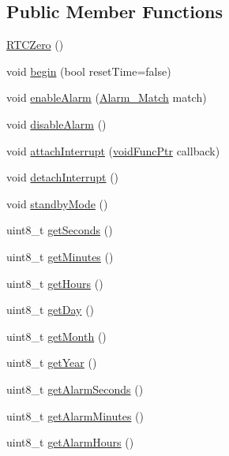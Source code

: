 \subsection*{Public Member Functions}
\begin{DoxyCompactItemize}
\item 
\hyperlink{class_r_t_c_zero_af74f4cc9bc122628c0023e77b7b18c76}{R\+T\+C\+Zero} ()
\item 
void \hyperlink{class_r_t_c_zero_ac6ad9d73cb8d3a0575e7cfc2b26a5412}{begin} (bool reset\+Time=false)
\item 
void \hyperlink{class_r_t_c_zero_af2923fee4310485bc922898376f5042c}{enable\+Alarm} (\hyperlink{class_r_t_c_zero_a331ac87204394f0e197122b8962149cc}{Alarm\+\_\+\+Match} match)
\item 
void \hyperlink{class_r_t_c_zero_a9c1b7a7b7f8ed3cabbdc039ede726631}{disable\+Alarm} ()
\item 
void \hyperlink{class_r_t_c_zero_a306f2bbbdfa83d21f8f577c11b73e76b}{attach\+Interrupt} (\hyperlink{_r_t_c_zero_8h_af47ec912687cb72725d5e529eccdbb48}{void\+Func\+Ptr} callback)
\item 
void \hyperlink{class_r_t_c_zero_a6ca6de2448cadaa33a87cdd4278cdf27}{detach\+Interrupt} ()
\item 
void \hyperlink{class_r_t_c_zero_a2fab941e64ffe5501c30c085a5b3833e}{standby\+Mode} ()
\item 
uint8\+\_\+t \hyperlink{class_r_t_c_zero_a914daa26d6ab1a3637a4696801532377}{get\+Seconds} ()
\item 
uint8\+\_\+t \hyperlink{class_r_t_c_zero_a813435838c1c830ab61e81f2c50cd76c}{get\+Minutes} ()
\item 
uint8\+\_\+t \hyperlink{class_r_t_c_zero_a4e3c72195b429d690ca5e3febb9a2d8f}{get\+Hours} ()
\item 
uint8\+\_\+t \hyperlink{class_r_t_c_zero_a9569ba1ee80390da5c9feb9c33681ac2}{get\+Day} ()
\item 
uint8\+\_\+t \hyperlink{class_r_t_c_zero_ab5a20277839b8d68d7469feb95b027ec}{get\+Month} ()
\item 
uint8\+\_\+t \hyperlink{class_r_t_c_zero_a87b268ab9f4e2ea4b0aca4ca7f9d48e6}{get\+Year} ()
\item 
uint8\+\_\+t \hyperlink{class_r_t_c_zero_a05ca5622ea0d01662326c251d3f4e960}{get\+Alarm\+Seconds} ()
\item 
uint8\+\_\+t \hyperlink{class_r_t_c_zero_a9b689b5208dc3bd0d80524e0d5c52873}{get\+Alarm\+Minutes} ()
\item 
uint8\+\_\+t \hyperlink{class_r_t_c_zero_a0758261eb8ba11c90e903b5e38a6cee8}{get\+Alarm\+Hours} ()

\end{DoxyCompactItemize}
